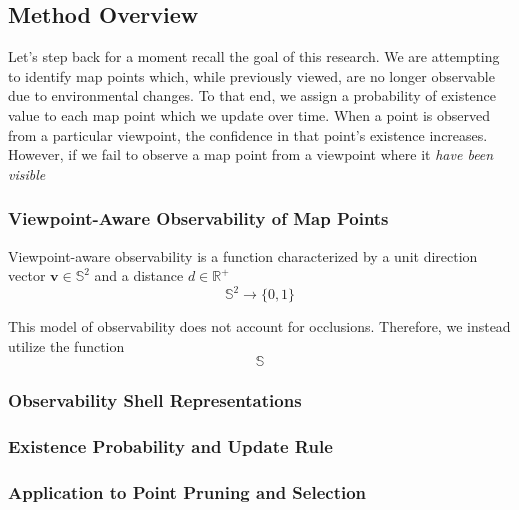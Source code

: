 \subsection{Method Overview}

Let's step back for a moment recall the goal of this research. We are attempting to identify map points which, while previously viewed, are no longer observable due to environmental changes. To that end, we assign a probability of existence value to each map point which we update over time. When a point is observed from a particular viewpoint, the confidence in that point's existence increases. However, if we fail to observe a map point from a viewpoint where it \it have been visible

\subsubsection{Viewpoint-Aware Observability of Map Points}


Viewpoint-aware observability is a function characterized by a unit direction vector $\mathbf{v}\in\mathbb{S}^2$ and a distance $d\in\mathbb{R}^+$
$$
    \mathbb{S}^2\rightarrow\{0,1\}
$$


This model of observability does not account for occlusions. Therefore, we instead utilize the function
$$
    \mathbb{S}
$$



\subsubsection{Observability Shell Representations}

\subsubsection{Existence Probability and Update Rule}

\subsubsection{Application to Point Pruning and Selection}
